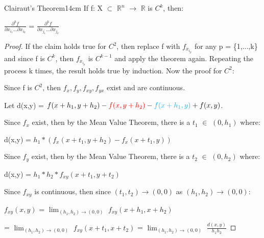     \newpage



    \begin{wtheorem}{Clairaut's Theorem}{14cm}
        If f: X $\subset$ $\mathbb{R}^n$ $\rightarrow$ $\mathbb{R}$
        is $C^k$, then:

        \hspace{0.5cm}
        $\frac{\partial^k f}{\partial x_{i_1} ... \partial x_{i_k}}$
        = $\frac{\partial^k f}{\partial x_{j_1} ... \partial x_{j_k}}$
    \end{wtheorem}

    \begin{proof}
        If the claim holds true for $C^2$, then replace f with
        $f_{x_{i_p}}$ for any p = \{1,...,k\} and since f is $C^k$,
        then $f_{x_{i_p}}$ is $C^{k-1}$ and apply the theorem again.
        Repeating the process k times, the result holds true by induction.
        Now the proof for $C^2$:

        \vspace{0.3cm}

        Since f is $C^2$, then $f_x,f_y,f_{xy},f_{yx}$
        exist and are continuous.

        Let d(x,y) = $f(x+h_1,y+h_2) - {\color{red} f(x,y+h_2)}
                        - {\color{lblue} f(x+h_1,y)} + f(x,y)$.

        Since $f_x$ exist, then by the Mean Value Theorem,
        there is a $t_1$ $\in$ $(0,h_1)$ where:

        \hspace{0.5cm}
        d(x,y) = $h_1*(f_x(x+t_1,y+h_2) - f_x(x+t_1,y))$

        Since $f_y$ exist, then by the Mean Value Theorem,
        there is a $t_2$ $\in$ $(0,h_2)$ where:

        \hspace{0.5cm}
        d(x,y) = $h_1*h_2*f_{xy}(x+t_1,y+t_2)$

        Since $f_{xy}$ is continuous, then since
        $(t_1,t_2) \rightarrow (0,0)$ as $(h_1,h_2) \rightarrow (0,0)$:

        \hspace{0.5cm}
        $f_{xy}(x,y)$
        = $\lim_{(h_1,h_2) \rightarrow (0,0)}$ $f_{xy}(x+h_1,x+h_2)$

        \hspace{2.15cm}
        = $\lim_{(h_1,h_2) \rightarrow (0,0)}$ $f_{xy}(x+t_1,x+t_2)$
        = $\lim_{(h_1,h_2) \rightarrow (0,0)}$ $\frac{d(x,y)}{h_1h_2}$


\end{proof}
